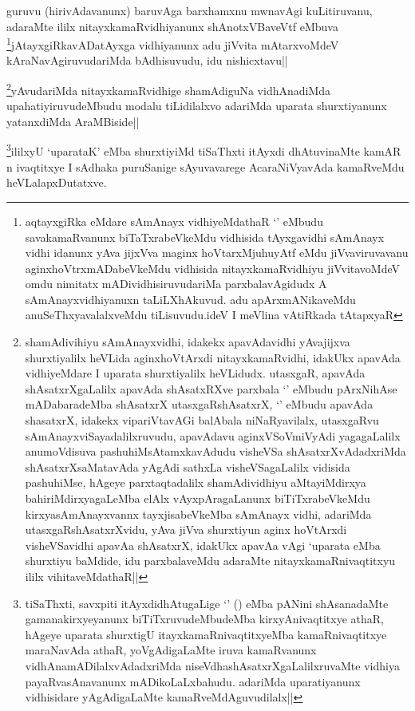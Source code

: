 
\begin{artha}
guruvu (hirivAdavanunx) baruvAga barxhamxnu mwnavAgi kuLitiruvanu, adaraMte ililx nitayxkamaRvidhiyanunx shAnotxVBaveVtf eMbuva \footnote{aqtayxgiRka eMdare sAmAnayx vidhiyeMdathaR `\stext' eMbudu savakamaRvanunx biTaTxrabeVkeMdu vidhisida tAyxgavidhi sAmAnayx vidhi idanunx yAva jijxVva maginx hoVtarxMjuhuyAtf eMdu jiVvaviruvavanu aginxhoVtrxmADabeVkeMdu vidhisida nitayxkamaRvidhiyu jiVvitavoMdeV omdu nimitatx mADividhisiruvudariMa parxbalavAgidudx A sAmAnayxvidhiyanuxn taLiLXhAkuvud. adu apArxmANikaveMdu anuSeThxyavalalxveMdu tiLisuvudu.ideV I meVlina vAtiRkada tAtapxyaR}jAtayxgiRkavADatAyxga vidhiyanunx adu jiVvita mAtarxvoMdeV kAraNavAgiruvudariMda bAdhisuvudu, idu nishicxtavu||
\end{artha}

\begin{artha}
\footnote{shamAdivihiyu sAmAnayxvidhi, idakekx apavAdavidhi yAvajijxva shurxtiyalilx heVLida aginxhoVtArxdi nitayxkamaRvidhi, idakUkx apavAda vidhiyeMdare I uparata shurxtiyalilx heVLidudx. utasxgaR, apavAda shAsatxrXgaLalilx apavAda shAsatxRXve parxbala `\stext' eMbudu pArxNihAse mADabaradeMba shAsatxrX utasxgaRshAsatxrX, `\stext'  eMbudu apavAda shasatxrX, idakekx vipariVtavAGi balAbala niNaRyavilalx, utasxgaRvu sAmAnayxviSayadalilxruvudu, apavAdavu aginxVSoVmiVyAdi yagagaLalilx anumoVdisuva pashuhiMsAtamxkavAdudu visheVSa shAsatxrXvAdadxriMda shAsatxrXsaMatavAda yAgAdi sathxLa visheVSagaLalilx vidisida pashuhiMse, hAgeye parxtaqtadalilx shamAdividhiyu aMtayiMdirxya bahiriMdirxyagaLeMba elAlx vAyxpAragaLanunx biTiTxrabeVkeMdu kirxyasAmAnayxvannx tayxjisabeVkeMba sAmAnayx vidhi, adariMda utasxgaRshAsatxrXvidu, yAva jiVva shurxtiyun aginx hoVtArxdi visheVSavidhi apavAa shAsatxrX, idakUkx apavAa vAgi `uparata eMba shurxtiyu baMdide, idu parxbalaveMdu adaraMte nitayxkamaRnivaqtitxyu  ililx vihitaveMdathaR||}yAvudariMda nitayxkamaRvidhige shamAdiguNa vidhAnadiMda upahatiyiruvudeMbudu modalu tiLidilalxvo adariMda uparata shurxtiyanunx yatanxdiMda AraMBiside||
\end{artha}

\begin{artha}
\footnote{tiSaThxti, savxpiti itAyxdidhAtugaLige `\stext' (\stext) eMba pANini shAsanadaMte gamanakirxyeyanunx biTiTxruvudeMbudeMba kirxyAnivaqtitxye athaR, hAgeye uparata shurxtigU itayxkamaRnivaqtitxyeMba kamaRnivaqtitxye maraNavAda athaR, yoVgAdigaLaMte iruva kamaRvanunx vidhAnamADilalxvAdadxriMda niseVdhashAsatxrXgaLalilxruvaMte vidhiya payaRvasAnavanunx mADikoLaLxbahudu. adariMda uparatiyanunx vidhisidare yAgAdigaLaMte kamaRveMdAguvudilalx||}ililxyU `uparataK' eMba shurxtiyiMd tiSaThxti itAyxdi dhAtuvinaMte kamAR n ivaqtitxye I sAdhaka puruSanige sAyuvavarege AcaraNiVyavAda kamaRveMdu heVLalapxDutatxve.
\end{artha}

